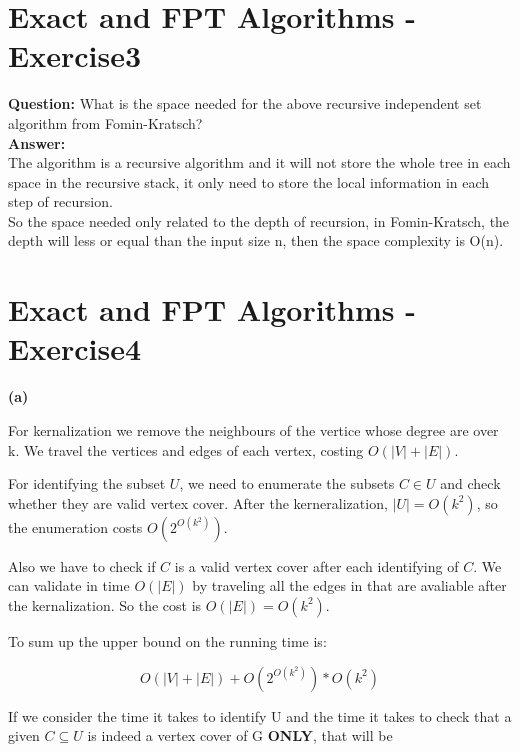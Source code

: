 \documentclass[12pt]{article}
\begin{document}
\section{Exact and FPT Algorithms - Exercise3}
\textbf{Question:}
What is the space needed for the above recursive independent set algorithm from Fomin-Kratsch?\\
\textbf{Answer:} \\
The algorithm is a recursive algorithm and it will not store the whole tree in each space in the recursive stack, it only need to store the local information in each step of recursion.\\
So the space needed only related to the depth of recursion, in Fomin-Kratsch, the depth will less or equal than the input size n, then the space complexity is O(n).

\section{Exact and FPT Algorithms - Exercise4}

\textbf{(a)}

For kernalization we remove the neighbours of the vertice whose degree are over k. We travel the vertices and edges of each vertex, costing $O(|V| + |E|)$. 

For identifying the subset $U$, we need to enumerate the subsets $C \in U$ and check whether they are valid vertex cover. After the kerneralization, $|U| = O(k^2)$, so the enumeration costs $O(2^{O(k^2)})$.

Also we have to check if $C$ is a valid vertex cover after each identifying of $C$. We can validate in time $O(|E|)$ by traveling all the edges in that are avaliable after the kernalization. So the cost is $O(|E|)=O(k^2)$.

To sum up the upper bound on the running time is:

\begin{equation}
O(|V| + |E|) + O(2^{O(k^2)}) * O(k^2)
\end{equation}

If we consider the time it takes to identify U and the time it takes to check that a given $C \subseteq U$ is indeed a vertex cover of G \textbf{ONLY}, that will be
\end{document}
